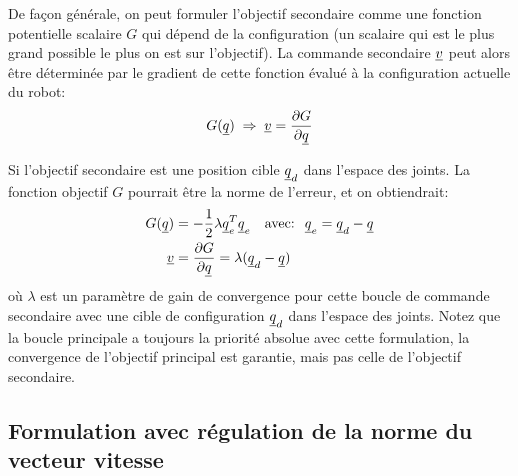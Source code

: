 De façon générale, on peut formuler l'objectif secondaire comme une fonction potentielle scalaire $G$ qui dépend de la configuration (un scalaire qui est le plus grand possible le plus on est sur l'objectif). La commande secondaire $\underline{v}$ peut alors être déterminée par le gradient de cette fonction évalué à la configuration actuelle du robot:
\begin{align}
	G( \underline{q} ) \; \Rightarrow \; \underline{v} = \frac{\partial G }{\partial \underline{q} }
\end{align}

Si l'objectif secondaire est une position cible $\underline{q}_d$ dans l'espace des joints. La fonction objectif $G$ pourrait être la norme de l'erreur, et on obtiendrait:
\begin{align}
	G( \col{q} ) &= - \frac{1}{2} \lambda \col{q}_e^T \col{q}_e
	\quad \text{avec: } \; \col{q}_e = \col{q}_d - \col{q} \\
	\col{v} &= \frac{\partial G }{\partial \col{q} } = \lambda \huge( \col{q}_d - \col{q} \huge)
\end{align}
où $\lambda$ est un paramètre de gain de convergence pour cette boucle de commande secondaire avec une cible de configuration $\underline{q}_d$ dans l'espace des joints. Notez que la boucle principale a toujours la priorité absolue avec cette formulation, la convergence de l'objectif principal est garantie, mais pas celle de l'objectif secondaire.

\subsection{Formulation avec régulation de la norme du vecteur vitesse}

